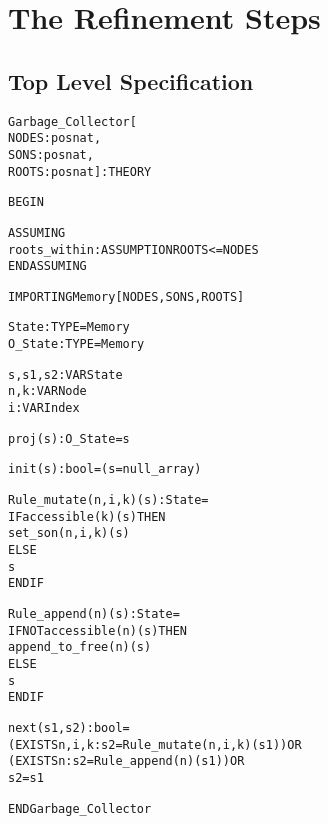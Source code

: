 
\newpage
\section{The Refinement Steps}
\subsection{Top Level Specification}

\begin{alltt}
%%%%%%%%%%%%%%%%%%%%%%%%%%%%%%%%%%%%%%%%%%%%%%%%%%%%%%%%%%%
% Garbage_Collector :                                     %
%   The top-level specification of the garbage collector. %
%%%%%%%%%%%%%%%%%%%%%%%%%%%%%%%%%%%%%%%%%%%%%%%%%%%%%%%%%%%

Garbage_Collector[
  NODES : posnat, 
  SONS  : posnat, 
  ROOTS : posnat] : THEORY

BEGIN

  ASSUMING
    roots_within : ASSUMPTION ROOTS <= NODES
  ENDASSUMING

  IMPORTING Memory[NODES,SONS,ROOTS]

  State   : TYPE = Memory
  O_State : TYPE = Memory

  s,s1,s2 : VAR State
  n,k     : VAR Node
  i       : VAR Index

  proj(s):O_State = s

  init(s):bool = (s = null_array)

  Rule_mutate(n,i,k)(s):State =
    IF accessible(k)(s) THEN 
      set_son(n,i,k)(s)
    ELSE 
      s
    ENDIF

  Rule_append(n)(s):State =
    IF NOT accessible(n)(s) THEN
      append_to_free(n)(s)
    ELSE 
      s
    ENDIF

  next(s1,s2):bool =
    (EXISTS n,i,k: s2 = Rule_mutate(n,i,k)(s1)) OR
    (EXISTS n: s2 = Rule_append(n)(s1)) OR
    s2 = s1

END Garbage_Collector
\end{alltt}


